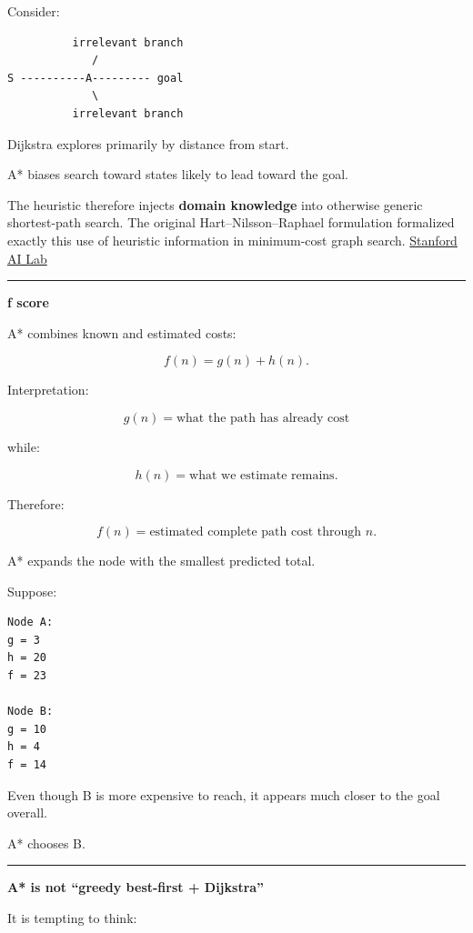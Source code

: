 Consider:

\begin{verbatim}
          irrelevant branch
             /
S ----------A--------- goal
             \
          irrelevant branch
\end{verbatim}

Dijkstra explores primarily by distance from start.

A* biases search toward states likely to lead toward the goal.

The heuristic therefore injects \textbf{domain knowledge} into otherwise generic shortest-path search. The original Hart--Nilsson--Raphael formulation formalized exactly this use of heuristic information in minimum-cost graph search. \href{https://ai.stanford.edu/~nilsson/OnlinePubs-Nils/PublishedPapers/astar.pdf?utm_source=chatgpt.com}{Stanford AI Lab}

\begin{center}\rule{0.5\linewidth}{0.5pt}\end{center}

\textbf{f score}

A* combines known and estimated costs:

\[
\boxed{
f(n)=g(n)+h(n).
}
\]

Interpretation:

\[
g(n)
=
\text{what the path has already cost}
\]

while:

\[
h(n)
=
\text{what we estimate remains}.
\]

Therefore:

\[
f(n)
=
\text{estimated complete path cost through }n.
\]

A* expands the node with the smallest predicted total.

Suppose:

\begin{verbatim}
Node A:
g = 3
h = 20
f = 23

Node B:
g = 10
h = 4
f = 14
\end{verbatim}

Even though B is more expensive to reach, it appears much closer to the goal overall.

A* chooses B.

\begin{center}\rule{0.5\linewidth}{0.5pt}\end{center}

\textbf{A* is not ``greedy best-first + Dijkstra''}

It is tempting to think:

